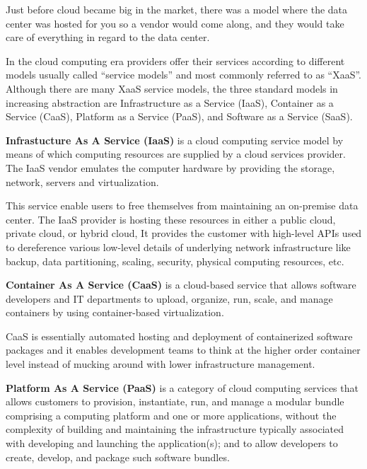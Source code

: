 Just before cloud became big in the market, there was a model where the data center was hosted for you so a vendor
would come along, and they would take care of everything in regard to the data center.


In the cloud computing era providers offer their services according to different models usually called ``service
models'' and most commonly referred to as ``XaaS''. Although there are many XaaS service models, the three standard
models in increasing abstraction are Infrastructure as a Service (IaaS), Container as a Service (CaaS), Platform
as a Service (PaaS), and Software as a Service (SaaS).

\textbf{Infrastucture As A Service (IaaS)} is a cloud computing service model by means of which computing
resources are supplied by a cloud services provider. The IaaS vendor emulates the computer hardware by providing the
storage, network, servers and virtualization.
\ed


This service enable users to free themselves from maintaining an on-premise data center. The IaaS provider is hosting
these resources in either a public cloud, private cloud, or hybrid cloud, It provides the customer with high-level
APIs used to dereference various low-level details of underlying network infrastructure like backup, data
partitioning, scaling, security, physical computing resources, etc.

\textbf{Container As A Service (CaaS)} is a cloud-based service that allows software developers and IT departments to
upload, organize, run, scale, and manage containers by using container-based virtualization.
\ed


CaaS is essentially automated hosting and deployment of containerized software packages and it enables development
teams to think at the higher order container level instead of mucking around with lower infrastructure management.

\textbf{Platform As A Service (PaaS)} is a category of cloud computing services that allows customers to
provision, instantiate, run, and manage a modular bundle comprising a computing platform and one or more applications,
without the complexity of building and maintaining the infrastructure typically associated with developing and
launching the application(s); and to allow developers to create, develop, and package such software bundles.
\ed

